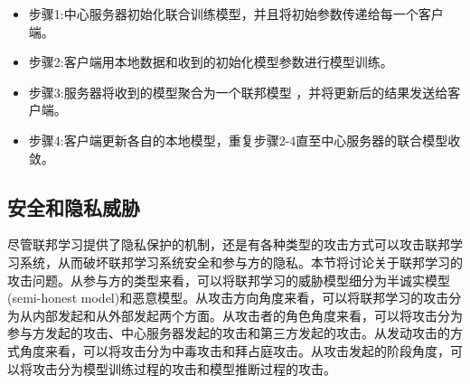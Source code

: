 \begin{itemize}
\item 步骤1:中心服务器初始化联合训练模型，并且将初始参数传递给每一个客户端。
\item 步骤2:客户端用本地数据和收到的初始化模型参数进行模型训练。
\item 步骤3:服务器将收到的模型聚合为一个联邦模型 ，并将更新后的结果发送给客户端。
\item 步骤4:客户端更新各自的本地模型，重复步骤2-4直至中心服务器的联合模型收敛。
\end{itemize}

\subsection{安全和隐私威胁}
尽管联邦学习提供了隐私保护的机制，还是有各种类型的攻击方式可以攻击联邦学习系统，从而破坏联邦学习系统安全和参与方的隐私。本节将讨论关于联邦学习的攻击问题。从参与方的类型来看，可以将联邦学习的威胁模型细分为半诚实模型 (semi-honest model)和恶意模型。从攻击方向角度来看，可以将联邦学习的攻击分为从内部发起和从外部发起两个方面。从攻击者的角色角度来看，可以将攻击分为参与方发起的攻击、中心服务器发起的攻击和第三方发起的攻击。从发动攻击的方式角度来看，可以将攻击分为中毒攻击和拜占庭攻击。从攻击发起的阶段角度，可以将攻击分为模型训练过程的攻击和模型推断过程的攻击。

